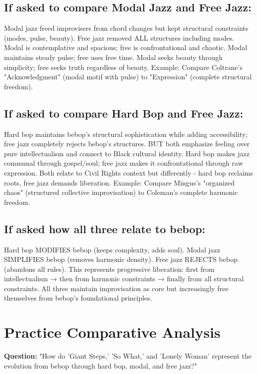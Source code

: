 \documentclass[11pt]{article}
\begin{document}
\subsection*{If asked to compare Modal Jazz and Free Jazz:}
Modal jazz freed improvisers from chord changes but kept structural constraints (modes, pulse, beauty). Free jazz removed ALL structures including modes. Modal is contemplative and spacious; free is confrontational and chaotic. Modal maintains steady pulse; free uses free time. Modal seeks beauty through simplicity; free seeks truth regardless of beauty. Example: Compare Coltrane's "Acknowledgment" (modal motif with pulse) to "Expression" (complete structural freedom).

\subsection*{If asked to compare Hard Bop and Free Jazz:}
Hard bop maintains bebop's structural sophistication while adding accessibility; free jazz completely rejects bebop's structures. BUT both emphasize feeling over pure intellectualism and connect to Black cultural identity. Hard bop makes jazz communal through gospel/soul; free jazz makes it confrontational through raw expression. Both relate to Civil Rights context but differently - hard bop reclaims roots, free jazz demands liberation. Example: Compare Mingus's "organized chaos" (structured collective improvisation) to Coleman's complete harmonic freedom.

\subsection*{If asked how all three relate to bebop:}
Hard bop MODIFIES bebop (keeps complexity, adds soul). Modal jazz SIMPLIFIES bebop (removes harmonic density). Free jazz REJECTS bebop (abandons all rules). This represents progressive liberation: first from intellectualism → then from harmonic constraints → finally from all structural constraints. All three maintain improvisation as core but increasingly free themselves from bebop's foundational principles.

\section*{Practice Comparative Analysis}

\textbf{Question:} "How do 'Giant Steps,' 'So What,' and 'Lonely Woman' represent the evolution from bebop through hard bop, modal, and free jazz?"
\end{document}
